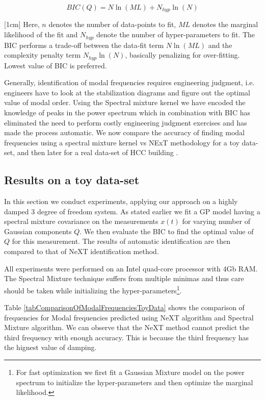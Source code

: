 \begin{mdframed}[hidealllines=true,backgroundcolor=blue!20]
\begin{equation}\label{eq:BIC}
    BIC(Q) = N\ln(ML) + N_{hyp}\ln(N)
\end{equation}

[1cm]
Here, $n$ denotes the number of data-points to fit, $ML$ denotes the marginal likelihood of the fit and $N_{hyp}$ denote the number of hyper-parameters to fit. The BIC performs a trade-off between the data-fit term $N\ln(ML)$ and the complexity penalty term $N_{hyp}\ln(N)$, basically penalizing for over-fitting. Lowest value of BIC is preferred. 
\end{mdframed}

Generally, identification of modal frequencies requires engineering judgment, i.e. engineers have to look at the stabilization diagrams and figure out the optimal value of modal order. Using the Spectral mixture kernel we have encoded the knowledge of peaks in the power spectrum which in combination with BIC has eliminated the need to perform costly engineering judgment exercises and has made the process automatic. We now compare the accuracy of finding modal frequencies using a spectral mixture kernel vs NExT \cite{james1995natural} methodology for a toy data-set, and then later for a real data-set of HCC building \cite{brincker2000modal}.

\subsection{Results on a toy data-set}
In this section we conduct experiments, applying our approach on a highly damped 3 degree of freedom system. As stated earlier we fit a GP model having a spectral mixture covariance on the measurements $x(t)$ for varying number of Gaussian components $Q$. We then evaluate the BIC to find the optimal value of $Q$ for this measurement. The results of automatic identification are then compared to that of NeXT identification method. 

All experiments were performed on an Intel quad-core processor with 4Gb RAM. The Spectral Mixture technique suffers from multiple minimas and thus care should be taken while initializing the hyper-parameters\footnote{For fast optimization we first fit a Gaussian Mixture model on the power spectrum to initialize the hyper-parameters and then optimize the marginal likelihood.}.  

Table \ref{tabComparisonOfModalFrequenciesToyData} shows the comparison of frequencies for Modal frequencies predicted using NeXT algorithm and Spectral Mixture algorithm. We can observe that the NeXT method cannot predict the third frequency with enough accuracy. This is because the third frequency has the hignest value of damping.

